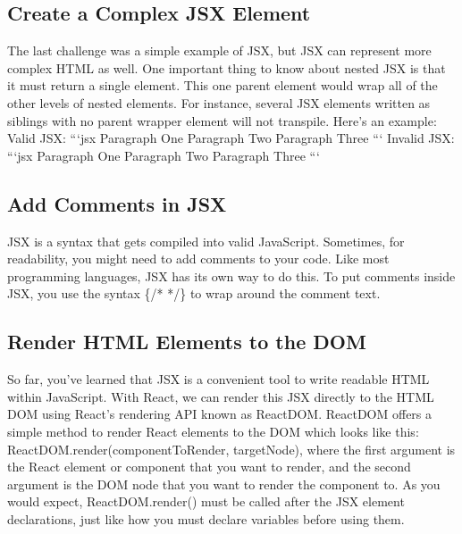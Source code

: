 \documentclass{article}%
\begin{document}
\subsection{Create a Complex JSX Element}%
\label{subsec:CreateaComplexJSXElement}%
The last challenge was a simple example of JSX, but JSX can represent more complex HTML as well.\newline%
One important thing to know about nested JSX is that it must return a single element.\newline%
This one parent element would wrap all of the other levels of nested elements.\newline%
For instance, several JSX elements written as siblings with no parent wrapper element will not transpile.\newline%
Here's an example:\newline%
Valid JSX:\newline%
```jsx\newline%
Paragraph One\newline%
Paragraph Two\newline%
Paragraph Three\newline%
```\newline%
Invalid JSX:\newline%
```jsx\newline%
Paragraph One\newline%
Paragraph Two\newline%
Paragraph Three\newline%
```\newline%

%
\subsection{Add Comments in JSX}%
\label{subsec:AddCommentsinJSX}%
JSX is a syntax that gets compiled into valid JavaScript. Sometimes, for readability, you might need to add comments to your code. Like most programming languages, JSX has its own way to do this.\newline%
To put comments inside JSX, you use the syntax \{/* */\} to wrap around the comment text.\newline%

%
\subsection{Render HTML Elements to the DOM}%
\label{subsec:RenderHTMLElementstotheDOM}%
So far, you've learned that JSX is a convenient tool to write readable HTML within JavaScript. With React, we can render this JSX directly to the HTML DOM using React's rendering API known as ReactDOM.\newline%
ReactDOM offers a simple method to render React elements to the DOM which looks like this: ReactDOM.render(componentToRender, targetNode), where the first argument is the React element or component that you want to render, and the second argument is the DOM node that you want to render the component to.\newline%
As you would expect, ReactDOM.render() must be called after the JSX element declarations, just like how you must declare variables before using them.\newline%
\end{document}
